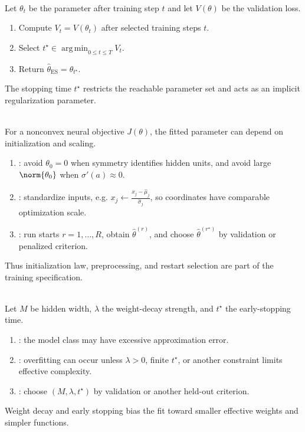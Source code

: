 \begin{method} \label{method:sl-early-stopping} \\
Let $\theta_t$ be the parameter after training step $t$ and let $V(\theta)$ be the validation loss.
\begin{enumerate}[label=(\roman*)]
\setlength{\itemsep}{0pt}
\item Compute $V_t=V(\theta_t)$ after selected training steps $t$.
\item Select $t^\star\in\operatorname*{arg\,min}_{0\leq t\leq T}V_t$.
\item Return $\widehat\theta_{\mathrm{ES}}=\theta_{t^\star}$.
\end{enumerate}
The stopping time $t^\star$ restricts the reachable parameter set and acts as an implicit regularization parameter.
\end{method}

\begin{remark} \label{rem:sl-neural-training-practicalities} \\
For a nonconvex neural objective $J(\theta)$, the fitted parameter can depend on initialization and scaling.
\begin{enumerate}[label=(\roman*)]
\setlength{\itemsep}{0pt}
\item {}: avoid $\theta_0=0$ when symmetry identifies hidden units, and avoid large $\norm{\theta_0}$ when $\sigma'(a)\approx0$.
\item {}: standardize inputs, e.g. $x_j\leftarrow\frac{x_j-\hat\mu_j}{\hat\sigma_j}$, so coordinates have comparable optimization scale.
\item {}: run starts $r=1,\ldots,R$, obtain $\widehat\theta^{(r)}$, and choose $\widehat\theta^{(r^\star)}$ by validation or penalized criterion.
\end{enumerate}
Thus initialization law, preprocessing, and restart selection are part of the training specification.
\end{remark}

\begin{remark} \label{rem:sl-hidden-units-and-weight-decay} \\
Let $M$ be hidden width, $\lambda$ the weight-decay strength, and $t^\star$ the early-stopping time.
\begin{enumerate}[label=(\roman*)]
\setlength{\itemsep}{0pt}
\item {}: the model class may have excessive approximation error.
\item {}: overfitting can occur unless $\lambda>0$, finite $t^\star$, or another constraint limits effective complexity.
\item {}: choose $(M,\lambda,t^\star)$ by validation or another held-out criterion.
\end{enumerate}
Weight decay and early stopping bias the fit toward smaller effective weights and simpler functions.
\end{remark}

